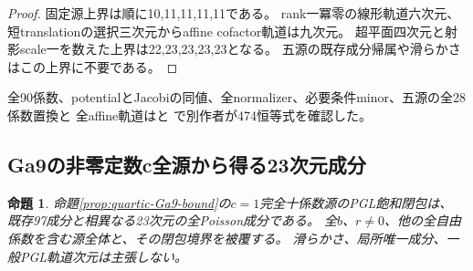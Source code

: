 \documentclass[a4paper,11pt]{ltjsarticle}
\newtheorem{proposition}{命題}[section]
\theoremstyle{definition}
\begin{document}
\begin{proof}
固定源上界は順に10,11,11,11,11である。
rank一冪零の線形軌道六次元、短translationの選択三次元からaffine cofactor軌道は九次元。
超平面四次元と射影scale一を数えた上界は22,23,23,23,23となる。
五源の既存成分帰属や滑らかさはこの上界に不要である。
\end{proof}
全90係数、potentialとJacobiの同値、全normalizer、必要条件minor、五源の全28係数置換と
全affine軌道はと
で別作者が474恒等式を確認した。

\subsection{Ga9の非零定数c全源から得る23次元成分}
\begin{proposition}\label{prop:ga9-constant-component}
命題\ref{prop:quartic-Ga9-bound}の$c=1$完全十係数源のPGL飽和閉包は、
既存97成分と相異なる23次元の全Poisson成分である。
全$b$、$r\ne0$、他の全自由係数を含む源全体と、その閉包境界を被覆する。
滑らかさ、局所唯一成分、一般PGL軌道次元は主張しない。
\end{proposition}
\end{document}
